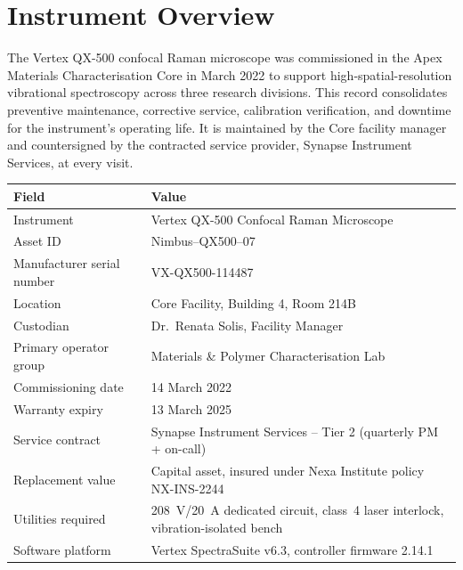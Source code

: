 \section{Instrument Overview}
\label{sec:overview}


The Vertex QX-500 confocal Raman microscope was commissioned in the Apex Materials Characterisation Core in March 2022 to support high-spatial-resolution vibrational spectroscopy across three research divisions. This record consolidates preventive maintenance, corrective service, calibration verification, and downtime for the instrument's operating life. It is maintained by the Core facility manager and countersigned by the contracted service provider, Synapse Instrument Services, at every visit.

\begin{center}
\renewcommand{\arraystretch}{1.15}
\begin{tabularx}{\linewidth}{@{}l X@{}}
\toprule
\rowcolor{slatePale}
\textbf{Field} & \textbf{Value} \\
\midrule
Instrument & Vertex QX-500 Confocal Raman Microscope \\
Asset ID & Nimbus--QX500--07 \\
Manufacturer serial number & VX-QX500-114487 \\
Location & Core Facility, Building 4, Room 214B \\
Custodian & Dr.\ Renata Solis, Facility Manager \\
Primary operator group & Materials \& Polymer Characterisation Lab \\
Commissioning date & 14 March 2022 \\
Warranty expiry & 13 March 2025 \\
Service contract & Synapse Instrument Services -- Tier 2 (quarterly PM + on-call) \\
Replacement value & Capital asset, insured under Nexa Institute policy NX-INS-2244 \\
Utilities required & 208~V/20~A dedicated circuit, class~4 laser interlock, vibration-isolated bench \\
Software platform & Vertex SpectraSuite v6.3, controller firmware 2.14.1 \\
\bottomrule
\end{tabularx}
\end{center}

